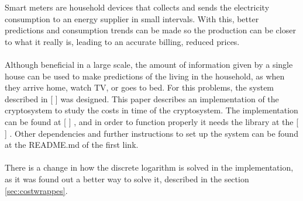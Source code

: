 
   Smart meters are household devices that collects and sends the electricity
   consumption to an energy supplier in small intervals. With this, better
   predictions and consumption trends can be made so the production can be closer to what it really is, leading to an accurate billing, reduced prices.\\
   \\
   Although beneficial in a large scale, the amount of information given by a single house can be used to make predictions of the living in the household, as when they arrive home, watch TV, or goes to bed. For this problems, the system described in [ ] %
   was designed. This paper describes an implementation of the cryptosystem to study the costs in time of the cryptosystem. The implementation can be found at [ ]%
   , and in order to function properly it needs the library at the [ ]
   . Other dependencies and further instructions to set up the system can be found at the README.md of the first link.
   \\\\
   There is a change in how the discrete logarithm is solved in the implementation, as it was found out a better way to solve it, described in
   the section \ref{sec:costwrappes}.
   
